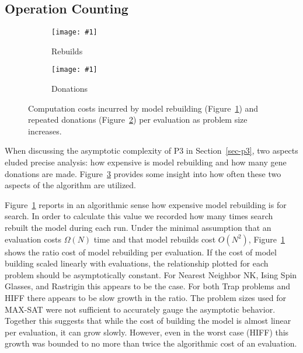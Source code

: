 \documentclass[twoside]{article}
\newcommand{\includegraphicsfit}[1]
{\texttt{[image: \#1]}}
\begin{document}
\subsection{Operation Counting}
\begin{figure}[t]
  \begin{centering}
    \begin{subfigure}{.5\textwidth}
      \begin{centering}
        \includegraphicsfit{rebuilds}
      \end{centering}
      \caption{Rebuilds}
      \label{fig-rebuilds}
    \end{subfigure}%
    \begin{subfigure}{.5\textwidth}
      \begin{centering}
        \includegraphicsfit{donations}
      \end{centering}
      \caption{Donations}
      \label{fig-donations}
    \end{subfigure}
  \end{centering}
  \caption{Computation costs incurred by model rebuilding (Figure~\ref{fig-rebuilds}) and
           repeated donations (Figure~\ref{fig-donations}) per evaluation as problem size increases.}
  \label{fig-costs}
\end{figure}

When discussing the asymptotic complexity of P3 in Section~\ref{sec-p3}, two aspects eluded precise
analysis: how expensive is model rebuilding and how many gene donations are made. Figure~\ref{fig-costs}
provides some insight into how often these two aspects of the algorithm are utilized.

Figure~\ref{fig-rebuilds} reports in an algorithmic sense how expensive model rebuilding is for search.
In order to calculate this value we recorded how many times search rebuilt the model during each run.
Under the minimal assumption that an evaluation costs $\Omega(N)$ time and that model rebuilds cost $O(N^2)$,
Figure~\ref{fig-rebuilds} shows the ratio cost of model rebuilding per evaluation. If the cost of model building
scaled linearly with evaluations, the relationship plotted for each problem should be asymptotically constant.
For Nearest Neighbor NK, Ising Spin Glasses, and Rastrigin this appears to be the case. For both Trap problems
and HIFF there appears to be slow growth in the ratio. The problem sizes used for MAX-SAT were not sufficient
to accurately gauge the asymptotic behavior. Together this suggests that while the cost of building the model
is almost linear per evaluation, it can grow slowly. However, even in the worst case (HIFF) this growth was
bounded to no more than twice the algorithmic cost of an evaluation.
\end{document}
